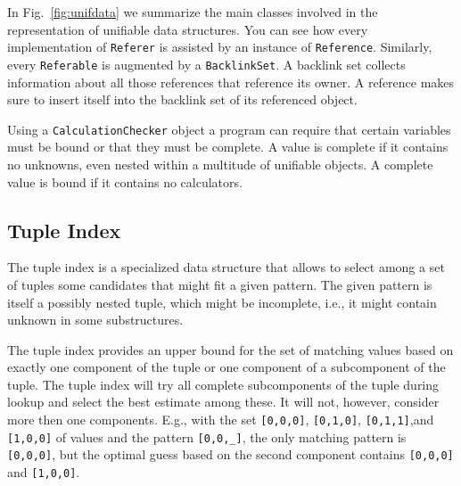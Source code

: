 In Fig.~\ref{fig:unifdata} we summarize the main classes involved in
the representation of unifiable data structures. You can see
how every implementation of \texttt{Referer} is assisted by an instance
of \texttt{Reference}. Similarly, every \texttt{Referable} is
augmented by a \texttt{BacklinkSet}. A backlink set collects 
information about all those references that reference its owner.
A reference makes sure to insert itself into the backlink set
of its referenced object.

Using a \texttt{CalculationChecker} object a program can require that
certain variables must be bound or that they must be complete.
A value is complete if it contains no unknowns, even nested
within a multitude of unifiable objects. A complete value
is bound if it contains no calculators.


\subsection{Tuple Index}

The tuple index is a specialized data structure that allows to select
among a set of tuples some candidates that might fit a given pattern.
The given pattern is itself a possibly nested tuple, which might be
incomplete, i.e., it might contain unknown in some substructures.

The tuple index provides an upper bound for the set of matching
values based on exactly one component of the tuple or one component
of a subcomponent of the tuple. The tuple index will try all
complete subcomponents of the tuple during lookup and select the best
estimate among these. It will not, however, consider more then one
components. E.g., with the set \texttt{[0,0,0]}, \texttt{[0,1,0]},
\texttt{[0,1,1]},and \texttt{[1,0,0]} of values and 
the pattern \verb:[0,0,_]:, the only matching pattern is
\texttt{[0,0,0]}, but the optimal guess based on
the second component contains \texttt{[0,0,0]} and \texttt{[1,0,0]}.
